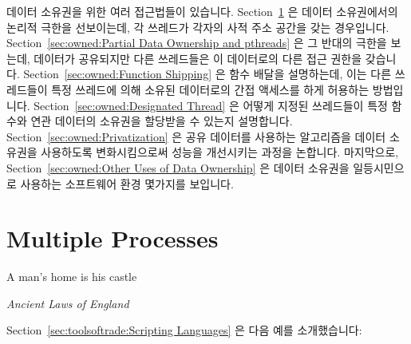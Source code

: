 데이터 소유권을 위한 여러 접근법들이 있습니다.
Section~\ref{sec:owned:Multiple Processes} 은 데이터 소유권에서의 논리적 극한을
선보이는데, 각 쓰레드가 각자의 사적 주소 공간을 갖는 경우입니다.
Section~\ref{sec:owned:Partial Data Ownership and pthreads} 은 그 반대의 극한을
보는데, 데이터가 공유되지만 다른 쓰레드들은 이 데이터로의 다른 접근 권한을
갖습니다.
Section~\ref{sec:owned:Function Shipping} 은 함수 배달을 설명하는데, 이는 다른
쓰레드들이 특정 쓰레드에 의해 소유된 데이터로의 간접 액세스를 하게 허용하는
방법입니다.
Section~\ref{sec:owned:Designated Thread} 은 어떻게 지정된 쓰레드들이 특정
함수와 연관 데이터의 소유권을 할당받을 수 있는지 설명합니다.
Section~\ref{sec:owned:Privatization} 은 공유 데이터를 사용하는 알고리즘을
데이터 소유권을 사용하도록 변화시킴으로써 성능을 개선시키는 과정을 논합니다.
마지막으로, Section~\ref{sec:owned:Other Uses of Data Ownership} 은 데이터
소유권을 일등시민으로 사용하는 소프트웨어 환경 몇가지를 보입니다.

\iffalse

There are a number of approaches to data ownership.
Section~\ref{sec:owned:Multiple Processes} presents the logical extreme
in data ownership, where each thread has its own private address space.
Section~\ref{sec:owned:Partial Data Ownership and pthreads} looks at
the opposite extreme, where the data is shared, but different threads
own different access rights to the data.
Section~\ref{sec:owned:Function Shipping} describes function shipping,
which is a way of allowing other threads to have indirect access to
data owned by a particular thread.
Section~\ref{sec:owned:Designated Thread} describes how designated
threads can be assigned ownership of a specified function and the
related data.
Section~\ref{sec:owned:Privatization} discusses improving performance
by transforming algorithms with shared data to instead use data ownership.
Finally, Section~\ref{sec:owned:Other Uses of Data Ownership} lists
a few software environments that feature data ownership as a
first-class citizen.

\fi

\section{Multiple Processes}
\label{sec:owned:Multiple Processes}
%
\epigraph{A man's home is his castle}{\emph{Ancient Laws of England}}

Section~\ref{sec:toolsoftrade:Scripting Languages}
은 다음 예를 소개했습니다:

\iffalse

